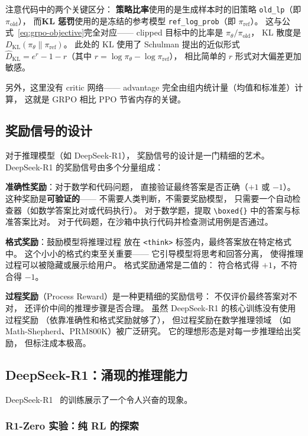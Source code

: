 注意代码中的两个关键区分：
\textbf{策略比率}使用的是生成样本时的旧策略 \texttt{old\_lp}（即 $\pi_{\text{old}}$），
而\textbf{KL 惩罚}使用的是冻结的参考模型 \texttt{ref\_log\_prob}（即 $\pi_{\text{ref}}$）。
这与公式~\eqref{eq:grpo-objective}完全对应——
clipped 目标中的比率是 $\pi_\theta / \pi_{\text{old}}$，
KL 散度是 $D_{\text{KL}}(\pi_\theta \| \pi_{\text{ref}})$。
此处的 KL 使用了 Schulman 提出的近似形式
$\hat{D}_{\text{KL}} = e^{r} - 1 - r$（其中 $r = \log \pi_\theta - \log \pi_{\text{ref}}$），
相比简单的 $r$ 形式对大偏差更加敏感。

另外，这里没有 critic 网络——
advantage 完全由组内统计量（均值和标准差）计算，
这就是 GRPO 相比 PPO 节省内存的关键。

\subsection{奖励信号的设计}

对于推理模型（如 DeepSeek-R1），
奖励信号的设计是一门精细的艺术。
DeepSeek-R1 的奖励信号由多个分量组成：

\textbf{准确性奖励}：对于数学和代码问题，
直接验证最终答案是否正确（$+1$ 或 $-1$）。
这种奖励是\textbf{可验证的}——
不需要人类判断，不需要奖励模型，
只需要一个自动检查器（如数学答案比对或代码执行）。
对于数学题，提取 \texttt{\textbackslash boxed\{\}} 中的答案与标准答案比对。
对于代码题，在沙箱中执行代码并检查测试用例是否通过。

\textbf{格式奖励}：鼓励模型将推理过程
放在 \texttt{<think>} 标签内，最终答案放在特定格式中。
这个小小的格式约束至关重要——
它引导模型将思考和回答分离，
使得推理过程可以被隐藏或展示给用户。
格式奖励通常是二值的：
符合格式得 $+1$，不符合得 $-1$。

\textbf{过程奖励}（Process Reward）是一种更精细的奖励信号：
不仅评价最终答案对不对，
还评价中间的推理步骤是否合理。
虽然 DeepSeek-R1 的核心训练没有使用过程奖励
（依靠准确性和格式奖励就够了），
但过程奖励在数学推理领域
（如 Math-Shepherd、PRM800K）被广泛研究。
它的理想形态是对每一步推理给出奖励，
但标注成本极高。

\subsection{DeepSeek-R1：涌现的推理能力}

DeepSeek-R1~\cite{deepseekr1} 的训练展示了一个令人兴奋的现象。

\subsubsection{R1-Zero 实验：纯 RL 的探索}

